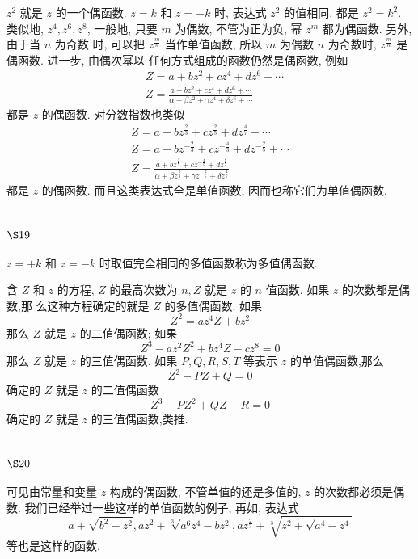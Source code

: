 $z^{2}$ 就是 $z$ 的一个偶函数. $z=k$ 和 $z=-k$ 时, 表达式 $z^{2}$ 的值相同, 都是 $z^{2}=k^{2}$. 类似地, $z^{4}, z^{6}, z^{8}$, 一般地, 只要 $m$ 为偶数, 不管为正为负, 幂 $z^{m}$ 都为偶函数. 另外, 由于当 $n$ 为奇数 时, 可以把 $z^{\frac{m}{n}}$ 当作单值函数, 所以 $m$ 为偶数 $n$ 为奇数时, $z^{\frac{m}{n}}$ 是偶函数. 进一步, 由偶次幂以 任何方式组成的函数仍然是偶函数, 例如
\[
\begin{aligned}
& Z=a+b z^{2}+c z^{4}+d z^{6}+\cdots \\
& Z=\frac{a+b z^{2}+c z^{4}+d z^{6}+\cdots}{\alpha+\beta z^{2}+\gamma z^{4}+\delta z^{6}+\cdots}
\end{aligned}
\]
都是 $z$ 的偶函数. 对分数指数也类似
\[
\begin{gathered}
Z=a+b z^{\frac{2}{3}}+c z^{\frac{2}{5}}+d z^{\frac{4}{7}}+\cdots \\
Z=a+b z^{-\frac{2}{3}}+c z^{-\frac{4}{3}}+d z^{-\frac{2}{5}}+\cdots \\
Z=\frac{a+b z^{\frac{2}{7}}+c z^{-\frac{4}{5}}+d z^{\frac{8}{3}}}{\alpha+\beta z^{\frac{2}{3}}+\gamma z^{-\frac{2}{5}}+\delta z^{\frac{4}{7}}}
\end{gathered}
\]
都是 $z$ 的偶函数. 而且这类表达式全是单值函数, 因而也称它们为单值偶函数.

\section{$\S 19$}

$z=+k$ 和 $z=-k$ 时取值完全相同的多值函数称为多值偶函数.

含 $Z$ 和 $z$ 的方程, $Z$ 的最高次数为 $n, Z$ 就是 $z$ 的 $n$ 值函数. 如果 $z$ 的次数都是偶数,那 么这种方程确定的就是 $Z$ 的多值偶函数. 如果
\[
Z^{2}=a z^{4} Z+b z^{2}
\]
那么 $Z$ 就是 $z$ 的二值偶函数; 如果
\[
Z^{3}-a z^{2} Z^{2}+b z^{4} Z-c z^{8}=0
\]
那么 $Z$ 就是 $z$ 的三值偶函数. 如果 $P, Q, R, S, T$ 等表示 $z$ 的单值偶函数,那么
\[
Z^{2}-P Z+Q=0
\]
确定的 $Z$ 就是 $z$ 的二值偶函数
\[
Z^{3}-P Z^{2}+Q Z-R=0
\]
确定的 $Z$ 就是 $z$ 的三值偶函数,类推.

\section{$\S 20$}

可见由常量和变量 $z$ 构成的偶函数, 不管单值的还是多值的, $z$ 的次数都必须是偶数. 我们已经举过一些这样的单值函数的例子, 再如, 表达式
\[
a+\sqrt{b^{2}-z^{2}}, a z^{2}+\sqrt[3]{a^{6} z^{4}-b z^{2}}, a z^{\frac{2}{3}}+\sqrt[3]{z^{2}+\sqrt{a^{4}-z^{4}}}
\]
等也是这样的函数.

